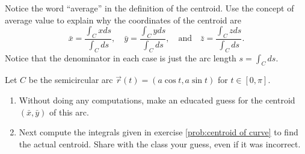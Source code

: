 \begin{problem}[Centroid]\label{prob:centroid of curve}%
  Notice the word ``average'' in the definition of the centroid. Use the concept of average value to explain why the coordinates of the centroid are %
$$
\bar x = \frac{\int_C x ds}{\int_C  ds},\quad
\bar y = \frac{\int_C y ds}{\int_C  ds},\quad 
\text{and}\quad
\bar z = \frac{\int_C z ds}{\int_C  ds}.
$$
Notice that the denominator in each case is just the arc length $s=\int_C ds$. 
\end{problem}


\begin{problem}\label{prob:semicircle centroid}
Let $C$ be the semicircular arc $\vec r(t)=(a\cos t, a\sin t)$ for $t\in[0,\pi]$. 
\begin{enumerate}
	\item Without doing any computations, make an educated guess for the centroid $(\bar x, \bar y)$ of this arc.
	\item Next compute the integrals given in exercise \ref{prob:centroid of curve} to find the actual centroid. Share with the class your guess, even if it was incorrect. 
\end{enumerate}
\end{problem}

